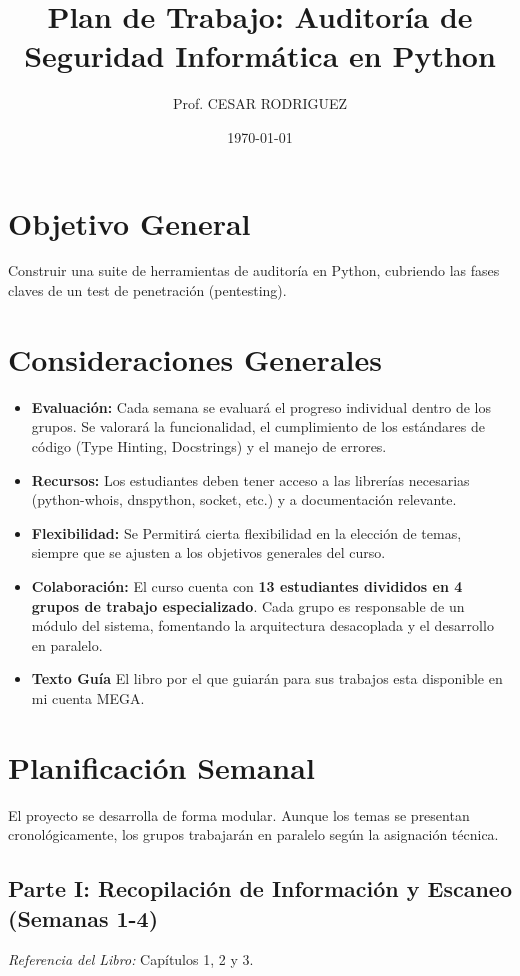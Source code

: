 \documentclass{article}
\title{Plan de Trabajo: Auditoría de Seguridad Informática en Python}
\author{Prof. CESAR RODRIGUEZ}
\date{\today}
\begin{document}
\maketitle

\section*{Objetivo General}
Construir una suite de herramientas de auditoría en Python, cubriendo las fases claves de un test de penetración (pentesting).

\section*{Consideraciones Generales}
\begin{itemize}
    \item \textbf{Evaluación:} Cada semana se evaluará el progreso individual dentro de los grupos. Se valorará la funcionalidad, el cumplimiento de los estándares de código (Type Hinting, Docstrings) y el manejo de errores.
    \item \textbf{Recursos:} Los estudiantes deben tener acceso a las librerías necesarias (python-whois, dnspython, socket, etc.) y a documentación relevante.
    \item \textbf{Flexibilidad:} Se Permitirá cierta flexibilidad en la elección de temas, siempre que se ajusten a los objetivos generales del curso.
    \item \textbf{Colaboración:} El curso cuenta con \textbf{13 estudiantes divididos en 4 grupos de trabajo especializado}. Cada grupo es responsable de un módulo del sistema, fomentando la arquitectura desacoplada y el desarrollo en paralelo.
    \item \textbf{Texto Guía} El libro por el que guiarán para sus trabajos esta disponible en mi cuenta MEGA.
\end{itemize}

\section*{Planificación Semanal}
El proyecto se desarrolla de forma modular. Aunque los temas se presentan cronológicamente, los grupos trabajarán en paralelo según la asignación técnica.

\subsection*{Parte I: Recopilación de Información y Escaneo (Semanas 1-4)}
\textit{Referencia del Libro:} Capítulos 1, 2 y 3.
\end{document}
